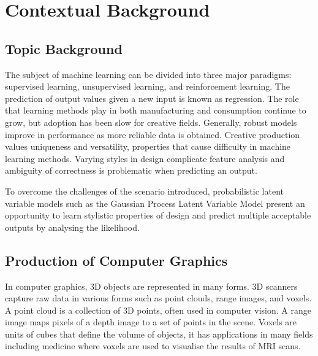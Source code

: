\documentclass[ %
                    author={Dillon Keith Diep [INCOMPLETE DRAFT, NOT FOR SUBMISSION]},
                supervisor={Dr. Carl Henrik Ek},
                    degree={MEng},
                     title={ART-CG:},
                  subtitle={Assisted Real-Time Content Generation of 3D Hair Geometry},
                      type={Research},
                      year={2014} ]{dissertation}
\begin{document}
\mainmatter


\chapter{Contextual Background}
\label{chap:context}

\section{Topic Background}
The subject of machine learning can be divided into three major paradigms: supervised learning, unsupervised learning, and reinforcement learning. The prediction of output values given a new input is known as regression. The role that learning methods play in both manufacturing and consumption continue to grow, but adoption has been slow for creative fields.  Generally, robust models improve in performance as more reliable data is obtained. Creative production values uniqueness and versatility, properties that cause difficulty in machine learning methods. Varying styles in design complicate feature analysis and ambiguity of correctness is problematic when predicting an output.

To overcome the challenges of the scenario introduced, probabilistic latent variable models such as the Gaussian Process Latent Variable Model \cite{gplvm} present an opportunity to learn stylistic properties of design and predict multiple acceptable outputs by analysing the likelihood.

\section{Production of Computer Graphics}
In computer graphics, 3D objects are represented in many forms. 3D scanners capture raw data in various forms such as point clouds, range images, and voxels. A point cloud is a collection of 3D points, often used in computer vision.  A range image maps pixels of a depth image to a set of points in the scene. Voxels are units of cubes that define the volume of objects, it has applications in many fields including medicine where voxels are used to visualise the results of MRI scans. \cite{mri}
\end{document}
